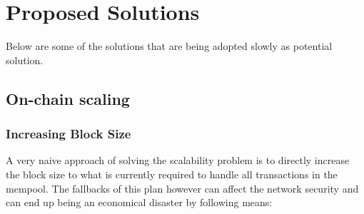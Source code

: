 \documentclass[journal,12pt,onecolumn,draftclsnofoot,]{IEEEtran}
\begin{document}
%

\section{Proposed Solutions}
Below are some of the solutions that are being adopted slowly as potential solution.

\subsection{On-chain scaling}

\subsubsection{Increasing Block Size}
A very naive approach of solving the scalability problem is to directly increase
the block size to what is currently required to handle all transactions in the
mempool. The fallbacks of this plan however can affect the network security and
can end up being an economical disaster by following means:
\end{document}
